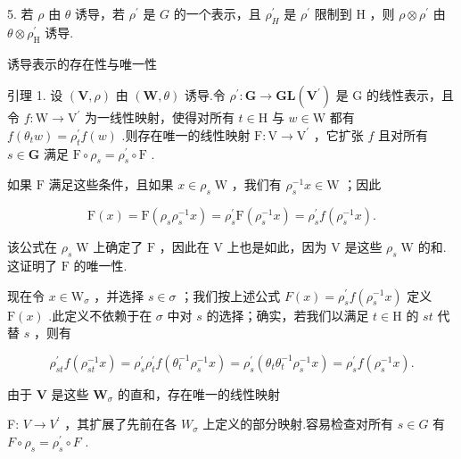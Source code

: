 \documentclass[10pt]{article}
\begin{document}
5. 若 \(\rho\) 由 \(\theta\) 诱导，若 \({\rho }^{\prime }\) 是 \(G\) 的一个表示，且 \({\rho }_{H}^{\prime }\) 是 \({\rho }^{\prime }\) 限制到 \(\mathrm{H}\) ，则 \(\rho  \otimes  {\rho }^{\prime }\) 由 \(\theta  \otimes  {\rho }_{\mathrm{H}}^{\prime }\) 诱导.

诱导表示的存在性与唯一性

引理 1. 设 \(\left( {\mathbf{V},\rho }\right)\) 由 \(\left( {\mathbf{W},\theta }\right)\) 诱导.令 \({\rho }^{\prime } : \mathbf{G} \rightarrow  \mathbf{{GL}}\left( {\mathbf{V}}^{\prime }\right)\) 是 \(\mathrm{G}\) 的线性表示，且令 \(f : \mathrm{W} \rightarrow  {\mathrm{V}}^{\prime }\) 为一线性映射，使得对所有 \(t \in  \mathrm{H}\) 与 \(w \in  \mathrm{W}\) 都有 \(f\left( {{\theta }_{t}w}\right)  = {\rho }_{t}^{\prime }f\left( w\right)\) .则存在唯一的线性映射 \(\mathrm{F} : \mathrm{V} \rightarrow  {\mathrm{V}}^{\prime }\) ，它扩张 \(f\) 且对所有 \(s \in  \mathbf{G}\) 满足 \(\mathrm{F} \circ  {\rho }_{s} = {\rho }_{s}^{\prime } \circ  \mathrm{F}\) .

如果 \(\mathrm{F}\) 满足这些条件，且如果 \(x \in  {\rho }_{s}\mathrm{\;W}\) ，我们有 \({\rho }_{s}^{-1}x \in  \mathrm{W}\) ；因此

\[
\mathrm{F}\left( x\right)  = \mathrm{F}\left( {{\rho }_{s}{\rho }_{s}^{-1}x}\right)  = {\rho }_{s}^{\prime }\mathrm{F}\left( {{\rho }_{s}^{-1}x}\right)  = {\rho }_{s}^{\prime }f\left( {{\rho }_{s}^{-1}x}\right) .
\]

该公式在 \({\rho }_{s}\mathrm{\;W}\) 上确定了 \(\mathrm{F}\) ，因此在 \(\mathrm{V}\) 上也是如此，因为 \(\mathrm{V}\) 是这些 \({\rho }_{s}\mathrm{\;W}\) 的和.这证明了 \(\mathrm{F}\) 的唯一性.

现在令 \(x \in  {\mathrm{W}}_{\sigma }\) ，并选择 \(s \in  \sigma\) ；我们按上述公式 \(F\left( x\right)  = {\rho }_{s}^{\prime }f\left( {{\rho }_{s}^{-1}x}\right)\) 定义 \(\mathrm{F}\left( x\right)\) .此定义不依赖于在 \(\sigma\) 中对 \(s\) 的选择；确实，若我们以满足 \(t \in  \mathrm{H}\) 的 \({st}\) 代替 \(s\) ，则有

\[
{\rho }_{st}^{\prime }f\left( {{\rho }_{st}^{-1}x}\right)  = {\rho }_{s}^{\prime }{\rho }_{t}^{\prime }f\left( {{\theta }_{t}^{-1}{\rho }_{s}^{-1}x}\right)  = {\rho }_{s}^{\prime }\left( {{\theta }_{t}{\theta }_{t}^{-1}{\rho }_{s}^{-1}x}\right)  = {\rho }_{s}^{\prime }f\left( {{\rho }_{s}^{-1}x}\right) .
\]

由于 \(\mathbf{V}\) 是这些 \({\mathbf{W}}_{\sigma }\) 的直和，存在唯一的线性映射

F: \(V \rightarrow  {V}^{\prime }\) ，其扩展了先前在各 \({W}_{\sigma }\) 上定义的部分映射.容易检查对所有 \(s \in  G\) 有 \(F \circ  {\rho }_{s} = {\rho }_{s}^{\prime } \circ  F\) .
\end{document}
